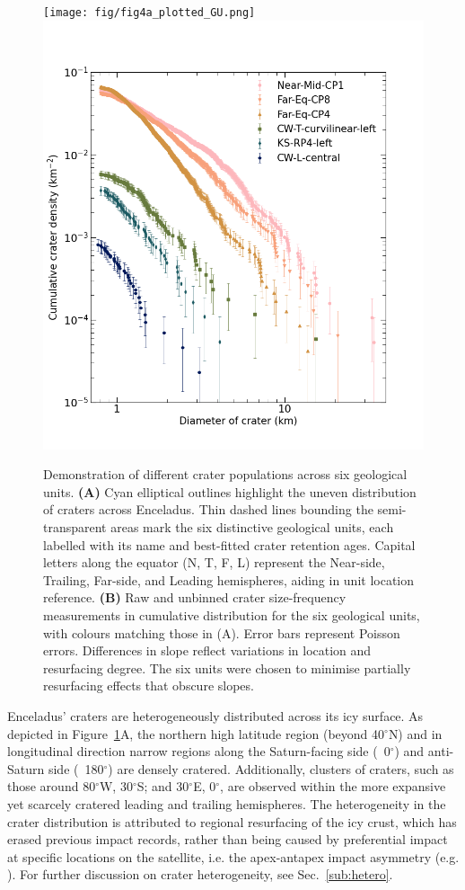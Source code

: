 \documentclass[preprint,11pt,3p,times,authoryear]{elsarticle}
\begin{document}
{\begin{figure}[ht!]
    \centering
    \texttt{[image: fig/fig4a\_plotted\_GU.png]}
    \includegraphics[width=0.5\linewidth]{fig/compare_fig4_icarus.png}
    \caption{Demonstration of different crater populations across six geological units.
        \textbf{(A)} Cyan elliptical outlines highlight the uneven distribution of craters across Enceladus. Thin dashed lines bounding the semi-transparent areas mark the six distinctive geological units, each labelled with its name and best-fitted crater retention ages. Capital letters along the equator (N, T, F, L) represent the Near-side, Trailing, Far-side, and Leading hemispheres, aiding in unit location reference.
        \textbf{(B)} Raw and unbinned crater size-frequency measurements in cumulative distribution for the six geological units, with colours matching those in (A). Error bars represent Poisson errors. Differences in slope reflect variations in location and resurfacing degree. The six units were chosen to minimise partially resurfacing effects that obscure slopes. }
    \label{fig:crater}
\end{figure}

Enceladus' craters are heterogeneously distributed across its icy surface. As depicted in Figure~\ref{fig:crater}A, the northern high latitude region (beyond 40$^\circ$N) and in longitudinal direction narrow regions along the Saturn-facing side (~0$^\circ$) and anti-Saturn side (~180$^\circ$) are densely cratered. Additionally, clusters of craters, such as those around 80$^\circ$W, 30$^\circ$S; and 30$^\circ$E, 0$^\circ$, are observed within the more expansive yet scarcely cratered leading and trailing hemispheres. The heterogeneity in the crater distribution is attributed to regional resurfacing of the icy crust, which has erased previous impact records, rather than being caused by preferential impact at specific locations on the satellite, i.e. the apex-antapex impact asymmetry (e.g. \citealt{Cuk2016}). For further discussion on crater heterogeneity, see Sec.~\ref{sub:hetero}.\\

}
\end{document}
